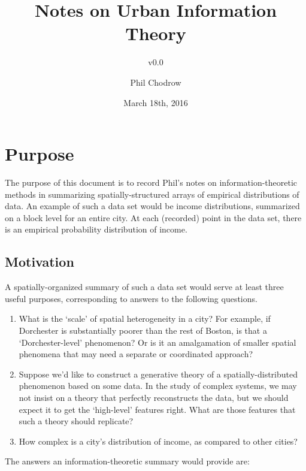 \documentclass[english]{scrartcl}
\title{Notes on Urban Information Theory}
\subtitle{v0.0}
\author{Phil Chodrow}
\date{March 18th, 2016}
\begin{document}
\maketitle

\section{Purpose}
	The purpose of this document is to record Phil's notes on information-theoretic methods in summarizing spatially-structured arrays of empirical distributions of data. An example of such a data set would be income distributions, summarized on a block level for an entire city. At each (recorded) point in the data set, there is an empirical probability distribution of income. 

	\subsection{Motivation}
		A spatially-organized summary of such a data set would serve at least three useful purposes, corresponding to answers to the following questions. 
		\begin{enumerate}
			\item What is the `scale' of spatial heterogeneity in a city? For example, if Dorchester is substantially poorer than the rest of Boston, is that a `Dorchester-level' phenomenon? Or is it an amalgamation of smaller spatial phenomena that may need a separate or coordinated approach?
			\item Suppose we'd like to construct a generative theory of a spatially-distributed phenomenon based on some data. In the study of complex systems, we may not insist on a theory that perfectly reconstructs the data, but we should expect it to get the `high-level' features right. What are those features that such a theory should replicate? 
			\item How complex is a city's distribution of income, as compared to other cities? 
		\end{enumerate}
		The answers an information-theoretic summary would provide are: 
\end{document}
